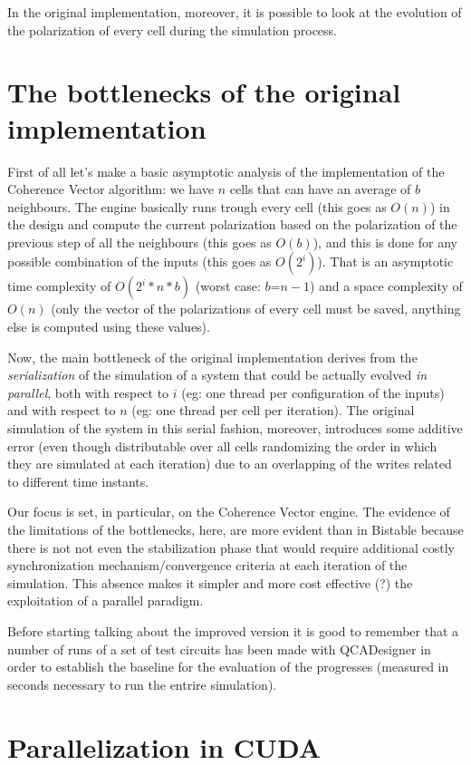 In the original implementation, moreover, it is possible to look at the evolution of the polarization of every cell during the simulation process.
\section {The bottlenecks of the original implementation}
First of all let's make a basic asymptotic analysis of the implementation of the Coherence Vector algorithm: we have $n$ cells that can have an average of $b$ neighbours. The engine basically runs trough every cell (this goes as $O(n)$) in the design and compute the current polarization based on the polarization of the previous step of all the neighbours (this goes as $O(b)$), and this is done for any possible combination of the inputs (this goes as $O(2^i)$). That is an asymptotic time complexity of $O(2^i*n*b)$  (worst case: $b$=$n-1$) and a space complexity of $O(n)$ (only the vector of the polarizations of every cell must be saved, anything else is computed using these values).

Now, the main bottleneck of the original implementation derives from the \textsl{serialization} of the simulation of a system that could be actually evolved \textsl{in parallel}, both with respect to $i$ (eg: one thread per configuration of the inputs) and with respect to $n$ (eg: one thread per cell per iteration). The original simulation of the system in this serial fashion, moreover, introduces some additive error (even though distributable over all cells randomizing the order in which they are simulated at each iteration) due to an overlapping of the writes related to different time instants. 

Our focus is set, in particular, on the Coherence Vector engine. The evidence of the limitations of the bottlenecks, here, are more evident than in Bistable because there is not not even the stabilization phase that would require additional costly synchronization mechanism/convergence criteria at each iteration of the simulation. This absence makes it simpler and more cost effective (?) the exploitation of a parallel paradigm.

Before starting talking about the improved version it is good to remember that a number of runs of a set of test circuits has been made with QCADesigner in order to establish the baseline for the evaluation of the progresses (measured in seconds necessary to run the entrire simulation).
\section {Parallelization in CUDA}
